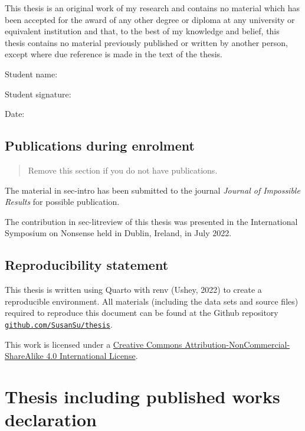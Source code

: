 \documentclass[
  letterpaper,
  DIV=11,
  numbers=noendperiod]{scrreprt}
\begin{document}

This thesis is an original work of my research and contains no material
which has been accepted for the award of any other degree or diploma at
any university or equivalent institution and that, to the best of my
knowledge and belief, this thesis contains no material previously
published or written by another person, except where due reference is
made in the text of the thesis.

Student name:

Student signature:

Date:

\hypertarget{publications-during-enrolment}{%
\subsection*{Publications during
enrolment}\label{publications-during-enrolment}}

\begin{quote}
Remove this section if you do not have publications.
\end{quote}

The material in sec-intro has been submitted to the journal
\emph{Journal of Impossible Results} for possible publication.

The contribution in sec-litreview of this thesis was presented in the
International Symposium on Nonsense held in Dublin, Ireland, in July
2022.

\hypertarget{reproducibility-statement}{%
\subsection*{Reproducibility
statement}\label{reproducibility-statement}}

This thesis is written using Quarto with renv (Ushey, 2022) to create a
reproducible environment. All materials (including the data sets and
source files) required to reproduce this document can be found at the
Github repository
\href{https://github.com/SusanSu/thesis}{\texttt{github.com/SusanSu/thesis}}.

This work is licensed under a
\href{http://creativecommons.org/licenses/by-nc-sa/4.0/}{Creative
Commons Attribution-NonCommercial-ShareAlike 4.0 International License}.

\hypertarget{thesis-including-published-works-declaration}{%
\section*{Thesis including published works
declaration}\label{thesis-including-published-works-declaration}}
\end{document}
